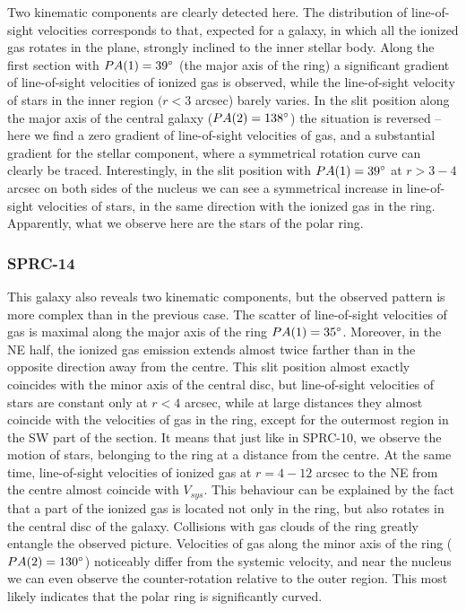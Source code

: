 \documentclass[useAMS,usenatbib]{mn2e}
\begin{document}
Two kinematic components are clearly detected here. The
distribution of line-of-sight velocities corresponds to that, expected
for a galaxy, in which all the ionized gas rotates in the plane,
strongly inclined to the inner stellar body. Along the first
section with $PA(1)=39\hbox{$^\circ$}$ (the major axis of the ring)  a
significant gradient of line-of-sight velocities of ionized gas is
observed, while the line-of-sight velocity of stars in the inner region
$(r<3$ arcsec) barely varies. In the   slit position  along the major axis
of the central galaxy ($PA(2)=138\hbox{$^\circ$}$) the situation is reversed
-- here we find a zero gradient of line-of-sight velocities of gas, and a
substantial gradient for the stellar component, where a
symmetrical rotation curve can clearly be traced. Interestingly,
in the   slit position  with $PA(1)=39\hbox{$^\circ$}$ at $r>3-4$ arcsec on both
sides of the nucleus we can see a symmetrical increase in line-of-sight
velocities of stars, in the same direction with the ionized  gas in the ring. Apparently,
what we observe here are the stars of the polar ring.




\subsubsection{SPRC-14}

This galaxy also reveals two kinematic components, but the
observed pattern is more complex   than in the previous case. The scatter of line-of-sight velocities
of gas is maximal along the major axis of the ring
$PA(1)=35\hbox{$^\circ$}$. Moreover, in the NE half, the ionized gas
emission extends almost twice farther than in the opposite direction away
from the centre. This  slit position almost exactly coincides  with the minor axis of the central disc, but line-of-sight velocities of stars are constant only at $r<4$ arcsec, while at
large distances they almost coincide with the velocities of gas in
the ring, except for the outermost region in the SW part of the
section. It means that just like in SPRC-10,  we observe the motion
of stars, belonging to the ring at a distance from the centre. At
the same time, line-of-sight velocities of ionized gas at $r=4-12$ arcsec
to the NE from the centre almost coincide with $V_{sys}$. This
behaviour can be explained by the fact that a part of the ionized
gas is located not only in the ring, but also rotates in the
central disc of the galaxy. Collisions with gas clouds of the ring
greatly entangle the observed picture. Velocities of gas
along the minor axis of the ring ($PA(2)=130\hbox{$^\circ$}$) noticeably
differ from the systemic velocity, and near the nucleus we
can even observe the counter-rotation relative to the outer
region. This most likely indicates that the polar ring is
significantly curved.
\end{document}
